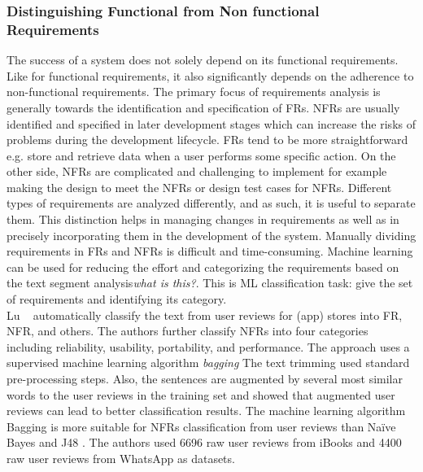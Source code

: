 \subsubsection{Distinguishing Functional from Non functional Requirements}

The success of a system does not solely depend on its functional requirements.
Like for functional requirements, it also significantly depends on the adherence
to non-functional requirements. The primary focus of requirements analysis is
generally towards the identification and specification of FRs. NFRs are usually
identified and specified in later development stages which can increase the
risks of problems during the development lifecycle. FRs tend to be more
straightforward e.g. store and retrieve data when a user performs some specific action. On the
other side, NFRs are complicated and challenging to implement for example making the
design to meet the NFRs or design test cases for NFRs.
Different types of requirements are analyzed differently, and as such, it is
useful to separate them. This distinction helps in managing changes in
requirements as well as in precisely incorporating them in the development of
the system. Manually dividing requirements in FRs and NFRs is difficult and
time-consuming. Machine learning can be used for reducing the effort and
categorizing the requirements based on the text segment analysis\emph{what is
this?}. This is ML classification task: give the set of requirements and
identifying its category.\\

 Lu \etal~ \cite{Lu:2017} automatically classify the text from user
reviews for (app) stores into FR, NFR, and others. The authors further classify
NFRs into four categories including reliability, usability, portability, and
performance. The approach uses a supervised machine learning algorithm
\emph{bagging} 
The text trimming used standard pre-processing steps. Also,  the sentences are
augmented by several most similar words to the user reviews in the training set
and showed that augmented user reviews can lead to better classification
results. The machine learning algorithm Bagging is more suitable
for NFRs classification from user reviews than Naïve Bayes and J48 . The authors
used 6696 raw user reviews from iBooks and 4400 raw user reviews from WhatsApp
as datasets.\\

